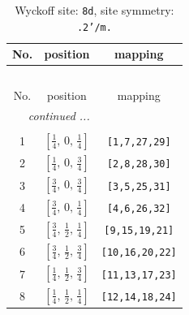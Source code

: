 \documentclass[fleqn,8pt]{jsarticle}
\begin{document}
\begin{longtable}{ccc}
\caption{Wyckoff site: {\tt 8d}, site symmetry: {\tt .2'/m.}}
 \\
 \hline \hline
No. & position & mapping \\ \hline \endfirsthead

\multicolumn{2}{l}{\tablename\ \thetable{}} \\
 \hline \hline
No. & position & mapping \\ \hline \endhead

 \hline \hline
\multicolumn{2}{r}{\footnotesize\it continued ...} \\ \endfoot

 \hline \hline
\multicolumn{2}{r}{} \\ \endlastfoot

1 & $\left[ \frac{1}{4},\, 0,\, \frac{1}{4} \right]$ & {\tt [1,7,27,29]} \\ \hline
2 & $\left[ \frac{1}{4},\, 0,\, \frac{3}{4} \right]$ & {\tt [2,8,28,30]} \\ \hline
3 & $\left[ \frac{3}{4},\, 0,\, \frac{3}{4} \right]$ & {\tt [3,5,25,31]} \\ \hline
4 & $\left[ \frac{3}{4},\, 0,\, \frac{1}{4} \right]$ & {\tt [4,6,26,32]} \\ \hline
5 & $\left[ \frac{3}{4},\, \frac{1}{2},\, \frac{1}{4} \right]$ & {\tt [9,15,19,21]} \\ \hline
6 & $\left[ \frac{3}{4},\, \frac{1}{2},\, \frac{3}{4} \right]$ & {\tt [10,16,20,22]} \\ \hline
7 & $\left[ \frac{1}{4},\, \frac{1}{2},\, \frac{3}{4} \right]$ & {\tt [11,13,17,23]} \\ \hline
8 & $\left[ \frac{1}{4},\, \frac{1}{2},\, \frac{1}{4} \right]$ & {\tt [12,14,18,24]} \\
\end{longtable}
\renewcommand{\arraystretch}{1.2}
\end{document}
